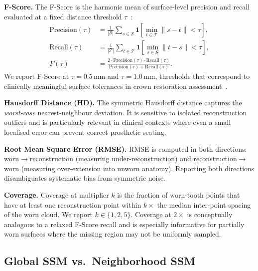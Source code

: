 \documentclass[11pt,a4paper]{article}
\begin{document}
\medskip
\textbf{F-Score.}
The F-Score is the harmonic mean of surface-level precision and
recall evaluated at a fixed distance threshold
$\tau$~\cite{tatarchenko2019single}:
\begin{align}
  \mathrm{Precision}(\tau) &= \frac{1}{|\mathcal{S}|}
      \sum_{s\in\mathcal{S}}
      \mathbf{1}\!\left[\min_{t\in\mathcal{T}}{\|s-t\|}<\tau\right], \\
  \mathrm{Recall}(\tau)    &= \frac{1}{|\mathcal{T}|}
      \sum_{t\in\mathcal{T}}
      \mathbf{1}\!\left[\min_{s\in\mathcal{S}}{\|t-s\|}<\tau\right], \\
  F(\tau) &= \frac{2\cdot\mathrm{Precision}(\tau)\cdot\mathrm{Recall}(\tau)}
                  {\mathrm{Precision}(\tau)+\mathrm{Recall}(\tau)}.
\end{align}
We report F-Score at $\tau{=}0.5\,\text{mm}$ and
$\tau{=}1.0\,\text{mm}$, thresholds that correspond to clinically
meaningful surface tolerances in crown restoration
assessment~\cite{revilla2021accuracy}.

\medskip
\textbf{Hausdorff Distance (HD).}
The symmetric Hausdorff distance captures the \emph{worst-case}
nearest-neighbour deviation.  It is sensitive to isolated
reconstruction outliers and is particularly relevant in clinical
contexts where even a small localised error can prevent correct
prosthetic seating.

\medskip
\textbf{Root Mean Square Error (RMSE).}
RMSE is computed in both directions: worn$\to$reconstruction
(measuring under-reconstruction) and reconstruction$\to$worn
(measuring over-extension into unworn anatomy).  Reporting both
directions disambiguates systematic bias from symmetric noise.

\medskip
\textbf{Coverage.}
Coverage at multiplier $k$ is the fraction of worn-tooth points
that have at least one reconstruction point within
$k\!\times$ the median inter-point spacing of the worn cloud.
We report $k\in\{1,2,5\}$.  Coverage at $2\times$ is conceptually
analogous to a relaxed F-Score recall and is especially informative
for partially worn surfaces where the missing region may not be
uniformly sampled.

\subsection{Global SSM vs.\ Neighborhood SSM}
\label{sec:globalvslocal}
\end{document}
